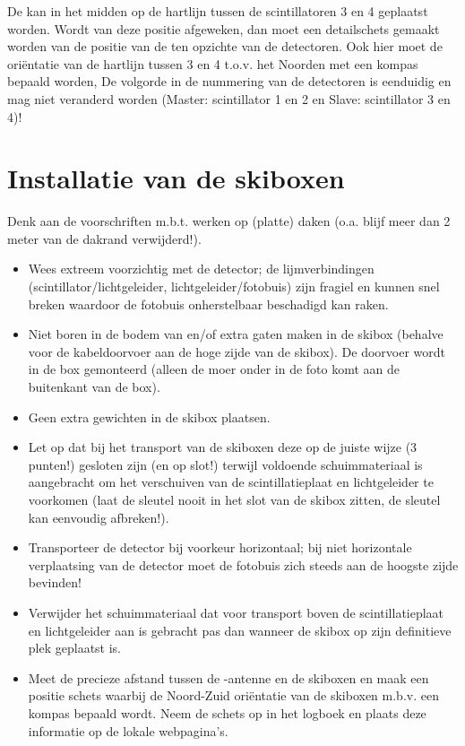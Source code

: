 De \gps kan in het midden op de hartlijn tussen de scintillatoren 3 en 4
geplaatst worden. Wordt van deze positie afgeweken, dan moet een
detailschets gemaakt worden van de positie van de \gps ten opzichte van
de detectoren. Ook hier moet de oriëntatie van de hartlijn tussen 3 en
4 t.o.v. het Noorden met een kompas bepaald worden, De volgorde in de
nummering van de detectoren is eenduidig en mag niet veranderd worden
(Master: scintillator 1 en 2 en Slave: scintillator 3 en 4)!


\section{Installatie van de skiboxen}

Denk aan de voorschriften m.b.t. werken op (platte) daken (o.a. blijf
meer dan 2 meter van de dakrand verwijderd!).

\begin{itemize}
    \item Wees extreem voorzichtig met de detector; de lijmverbindingen
    (scintillator/lichtgeleider, lichtgeleider/fotobuis) zijn fragiel
    en kunnen snel breken waardoor de fotobuis onherstelbaar beschadigd
    kan raken.
    \item Niet boren in de bodem van en/of extra gaten maken in de
    skibox (behalve voor de kabeldoorvoer aan de hoge zijde van de
    skibox). De doorvoer wordt in de box gemonteerd (alleen de moer
    onder in de foto komt aan de buitenkant van de box).
    \item Geen extra gewichten in de skibox plaatsen.
    \item Let op dat bij het transport van de skiboxen deze op de juiste
    wijze (3 punten!) gesloten zijn (en op slot!) terwijl voldoende
    schuimmateriaal is aangebracht om het verschuiven van de
    scintillatieplaat en lichtgeleider te voorkomen (laat de sleutel
    nooit in het slot van de skibox zitten, de sleutel kan eenvoudig
    afbreken!).
    \item Transporteer de detector bij voorkeur horizontaal; bij niet
    horizontale verplaatsing van de detector moet de
    fotobuis zich steeds aan de hoogste zijde bevinden!
    \item Verwijder het schuimmateriaal dat voor transport
    boven de scintillatieplaat en lichtgeleider aan is gebracht pas
    dan wanneer de skibox op zijn definitieve plek geplaatst is.
    \item Meet de precieze afstand tussen de \gps-antenne en de skiboxen
    en maak een positie schets waarbij de Noord-Zuid oriëntatie van de
    skiboxen m.b.v. een kompas bepaald wordt. Neem de schets op in het
    logboek en plaats deze informatie op de lokale webpagina’s.
\end{itemize}


